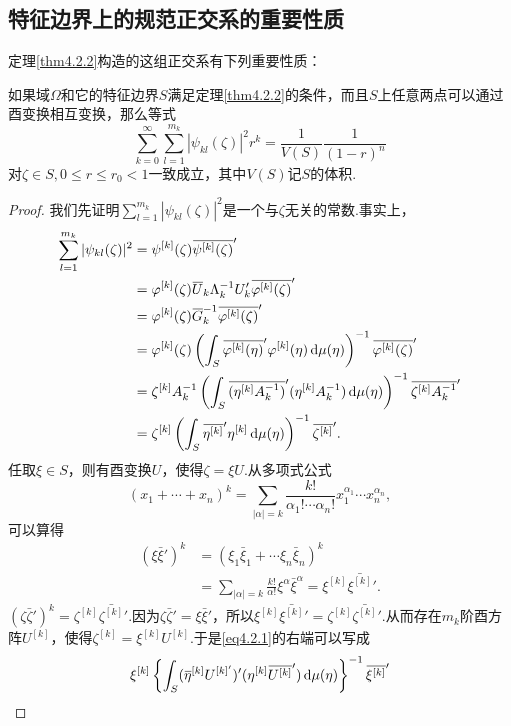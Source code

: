 \subsection{特征边界上的规范正交系的重要性质}
定理\ref{thm4.2.2}构造的这组正交系有下列重要性质：
\begin{theorem}\label{thm4.2.3}
	如果域$\Omega$和它的特征边界$S$满足定理\ref{thm4.2.2}的条件，而且$S$上任意两点可以通过酉变换相互变换，那么等式
	\[\sum_{k=0}^{\infty}\sum_{l=1}^{m_k}|\psi_{kl}(\zeta)|^2 r^k=\frac1{V(S)}\frac{1}{(1-r)^n}\]
	对$\zeta\in S,0\le r\le r_0<1$一致成立，其中$V(S)$记$S$的体积.
\end{theorem}
\begin{proof}
	我们先证明$\sum\limits_{l=1}^{m_k}|\psi_{kl}(\zeta)|^2$是一个与$\zeta$无关的常数.事实上，
	\begin{align}\label{eq4.2.1}
		\sum\limits_{l=1}^{m_k}|\psi_{kl}(\zeta)|^2
		&=\psi^{[k]}(\zeta){}\mkern1mu\overline{\mkern-1mu\psi^{[k]}(\zeta)}'\notag\\
		&=\varphi^{[k]}(\zeta){}\mkern1mu\overline{\mkern-1muU}_k\Lambda_k^{-1}U_k'{}\mkern1mu\overline{\mkern-1mu\varphi^{[k]}(\zeta)}'\notag\\
		&=\varphi^{[k]}(\zeta) {}\mkern1mu\overline{\mkern-1muG}_k^{-1}{}\mkern1mu\overline{\mkern-1mu\varphi^{[k]}(\zeta)}'\notag\\
		&=\varphi^{[k]}(\zeta)\left(\int_S {}\mkern1mu\overline{\mkern-1mu\varphi^{[k]}(\eta)}'\varphi^{[k]}(\eta)\mathop{}\!\mathrm{d}\mu(\eta)\right)^{-1}{}\mkern1mu\overline{\mkern-1mu\varphi^{[k]}(\zeta)}'\notag\\
		&=\zeta^{[k]}A_k^{-1}\left(\int_S {}\mkern1mu\overline{\mkern-1mu(\eta^{[k]}A_k^{-1})}'(\eta^{[k]}A_k^{-1})\mathop{}\!\mathrm{d}\mu(\eta)\right)^{-1}{}\mkern1mu\overline{\mkern-1mu\zeta^{[k]}A_k^{-1}}'\notag\\
		&=\zeta^{[k]}\left(\int_S{}\mkern1mu\overline{\mkern-1mu\eta^{[k]}}'\eta^{[k]}\mathop{}\!\mathrm{d}\mu(\eta)\right)^{-1}{}\mkern1mu\overline{\mkern-1mu\zeta^{[k]}}'.
	\end{align}
任取$\xi\in S$，则有酉变换$U$，使得$\zeta=\xi U$.从多项式公式
\[(x_1+\cdots+x_n)^k=\sum_{|\alpha|=k}\frac{k!}{\alpha_1!\cdots\alpha_n!}x_1^{\alpha_1}\cdots x_n^{\alpha_n},\]
可以算得
\begin{align*}
	(\xi\bar{\xi}')^k
	&=(\xi_1\bar{\xi}_1+\cdots\xi_n\bar{\xi}_n)^k\\
	&=\sum_{|\alpha|=k} \frac{k!}{\alpha!}\xi^\alpha \bar{\xi}^\alpha=\xi^{[k]}\bar{\xi^{[k]}}'.
\end{align*}
$(\zeta\bar{\zeta}')^k=\zeta^{[k]}\bar{\zeta^{[k]}}'$.因为$\zeta\bar{\zeta}'=\xi\bar{\xi}'$，所以$\xi^{[k]}\bar{\xi^{[k]}}'=\zeta^{[k]}\bar{\zeta^{[k]}}'$.从而存在$m_k$阶酉方阵$U^{[k]}$，使得$\zeta^{[k]}=\xi^{[k]}U^{[k]}$.于是\eqref{eq4.2.1}的右端可以写成
\begin{align*}
	&\xi^{[k]}\left\{\int_S (\bar{\eta}^{[k]}U^{[k]'})'(\eta^{[k]}\bar{U^{[k]}}')\dif\mu(\eta)\right\}^{-1}\bar{\xi^{[k]}}'\\

\end{align*}
\end{proof}
